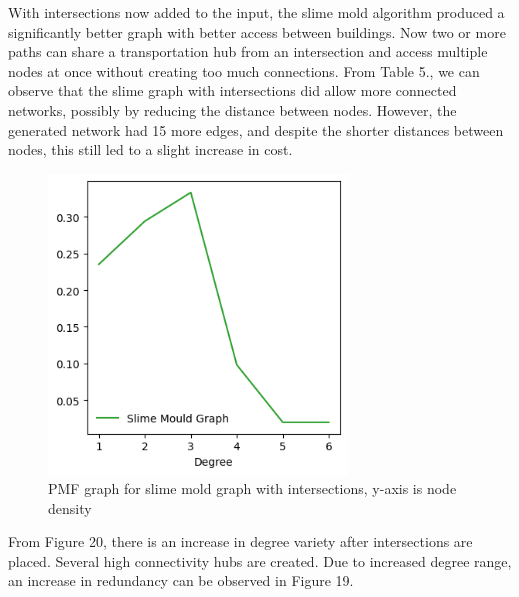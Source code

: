 \documentclass[11pt]{article}
\begin{document}
\par With intersections now added to the input, the slime mold algorithm produced a significantly better graph with better access between buildings. Now two or more paths can share a transportation hub from an intersection and access multiple nodes at once without creating too much connections. From Table 5., we can observe that the slime graph with intersections did allow more connected networks, possibly by reducing the distance between nodes. However, the generated network had 15 more edges, and despite the shorter distances between nodes, this still led to a slight increase in cost. 
\begin{figure}[H]
\centering
\includegraphics[width=300px]{pmfinter.png}
\caption{PMF graph for slime mold graph with intersections, y-axis is node density}
\end{figure}
\par From Figure 20, there is an increase in degree variety after intersections are placed. Several high connectivity hubs are created. Due to increased degree range, an increase in redundancy can be observed in Figure 19. 
\end{document}
